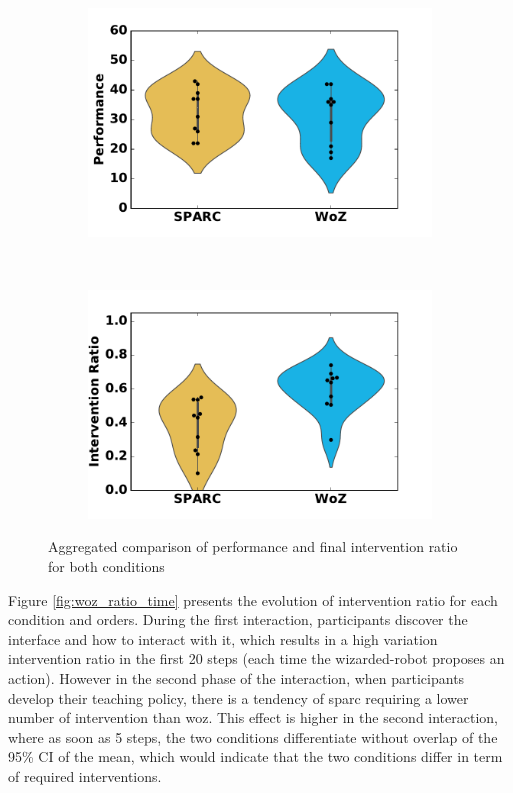 \begin{figure}[ht]
	\centering
	\begin{subfigure}[ht]{0.5\textwidth}
		\centering
		\includegraphics[width=1.0\textwidth]{perf.pdf}
	\end{subfigure}%
	~ 
	\begin{subfigure}[ht]{0.5\textwidth}
		\centering
		\includegraphics[width=1.0\textwidth]{ratio.pdf}
	\end{subfigure}
	\caption{Aggregated comparison of performance and final intervention ratio for both conditions}
	\label{fig:woz_comp}
\end{figure}

Figure \ref{fig:woz_ratio_time} presents the evolution of intervention ratio for each condition and orders. During the first interaction, participants discover the interface and how to interact with it, which results in a high variation intervention ratio in the first 20 steps (each time the wizarded-robot proposes an action). However in the second phase of the interaction,  when participants develop their teaching policy, there is a tendency of \gls{sparc} requiring a lower number of intervention than \gls{woz}. This effect is higher in the second interaction, where as soon as 5 steps, the two conditions differentiate without overlap of the 95\% CI of the mean, which would indicate that the two conditions differ in term of required interventions.

